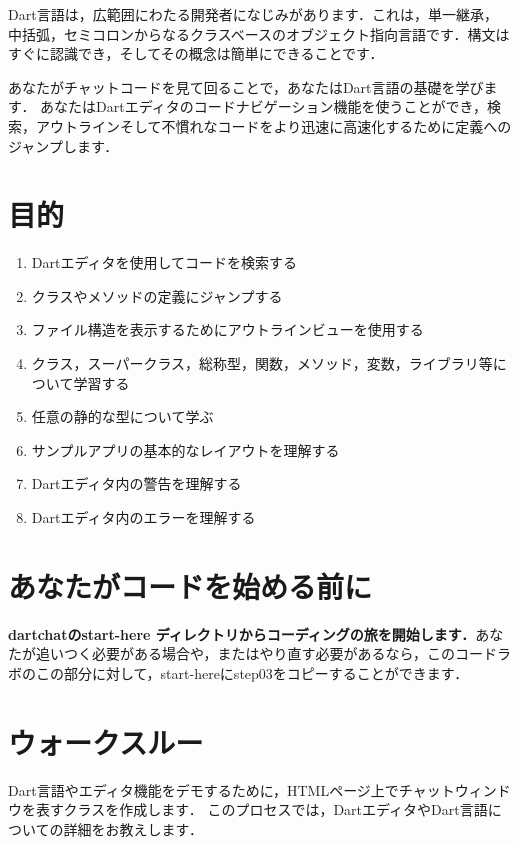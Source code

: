 
Dart言語は，広範囲にわたる開発者になじみがあります．これは，単一継承，中括弧，セミコロンからなるクラスベースのオブジェクト指向言語です．構文はすぐに認識でき，そしてその概念は簡単にできることです．

あなたがチャットコードを見て回ることで，あなたはDart言語の基礎を学びます． あなたはDartエディタのコードナビゲーション機能を使うことができ，検索，アウトラインそして不慣れなコードをより迅速に高速化するために定義へのジャンプします．

\section{目的}

\begin{enumerate}
\item Dartエディタを使用してコードを検索する
\item クラスやメソッドの定義にジャンプする
\item ファイル構造を表示するためにアウトラインビューを使用する
\item クラス，スーパークラス，総称型，関数，メソッド，変数，ライブラリ等について学習する
\item 任意の静的な型について学ぶ
\item サンプルアプリの基本的なレイアウトを理解する
\item Dartエディタ内の警告を理解する
\item Dartエディタ内のエラーを理解する
\end{enumerate}

\section{あなたがコードを始める前に}

{\bf dartchatのstart-here ディレクトリからコーディングの旅を開始します．}あなたが追いつく必要がある場合や，またはやり直す必要があるなら，このコードラボのこの部分に対して，start-hereにstep03をコピーすることができます．

\section{ウォークスルー}

Dart言語やエディタ機能をデモするために，HTMLページ上でチャットウィンドウを表すクラスを作成します． このプロセスでは，DartエディタやDart言語についての詳細をお教えします．

